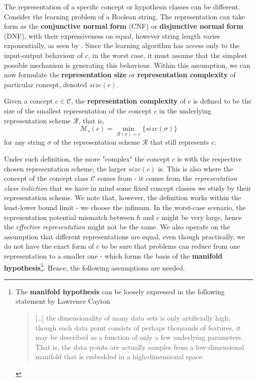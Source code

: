 \documentclass[10pt]{article} %
\begin{document}
The representation of a specific concept or hypothesis classes can be different. Consider the learning problem of a Boolean string. The representation can take form as the \textbf{conjunctive normal form} (CNF) or \textbf{disjunctive normal form} (DNF), with their expressiveness on equal, however string length varies exponentially, as seen by \cite{Wegener1987,MiltersenRadhakrishnanWegener2005,DarwicheMarquis2002}. Since the learning algorithm has access only to the input-output behaviour of $c$, in the worst case, it must assume that the simplest possible mechanism is generating this behaviour. Within this assumption, we can now formulate the \textbf{representation size} or \textbf{representation complexity} of particular concept, denoted $size(c)$. 
\begin{definition}
    Given a concept $c\in\mathcal{C}$, the \textbf{representation complexity} of $c$ is defined to be the size of the smallest representation of the concept $c$ in the underlying representation scheme $\mathcal{R}$, that is, 
    \begin{equation}
    \mathcal{M}_{r}(c) = \min_{\mathcal{R}(\sigma)=c}\{size(\sigma)\}
\end{equation}
for any string $\sigma$ of the representation scheme $\mathcal{R}$ that still represents $c$.
\end{definition}
Under such definition, the more "complex" the concept $c$ is with the respective chosen representation scheme, the larger $size(c)$ is. This is also where the concept of the concept class $\mathcal{C}$ comes from - it comes from the \textit{representation class indiction} that we have in mind some fixed concept classes we study by their representation scheme. We note that, however, the definition works within the least-lower bound limit - we choose the infimum. In the worst-case scenario, the representation potential mismatch between $h$ and $c$ might be very large, hence the \textit{effective representation} might not be the same. We also operate on the assumption that different representations are equal, even though practically, we do not have the exact form of $c$ to be sure that problems can reduce from one representation to a smaller one - which forms the basis of the \textbf{manifold hypothesis}\footnote{The \textbf{manifold hypothesis} can be loosely expressed in the following statement by Lawrence Cayton \begin{quote}
  [\dots] the dimensionality of many data sets is only artificially high; though each data point consists of perhaps thousands of features, it may be described as a function of only a few underlying parameters. That is, the data points are actually samples from a low-dimensional manifold that is embedded in a high-dimensional space. 
\end{quote}}. Hence, the following assumptions are needed. 
\end{document}
